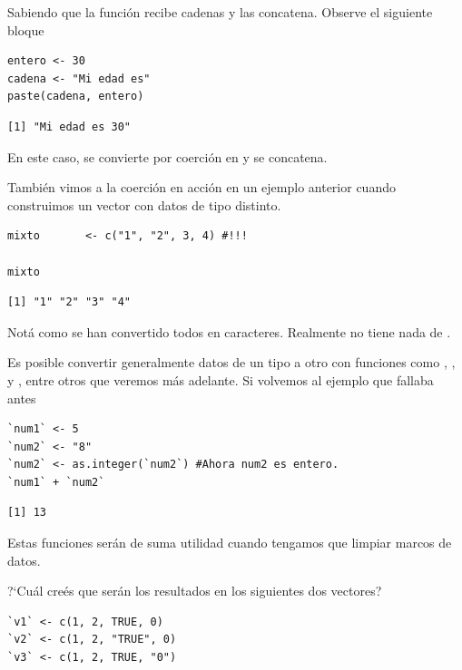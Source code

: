 \documentclass[8pt]{beamer}
\begin{document}
\begin{frame}[fragile]
	Sabiendo que la función  recibe cadenas y las concatena. Observe el siguiente bloque
\begin{lstlisting}[style=RScript]
entero <- 30
cadena <- "Mi edad es"
paste(cadena, entero)
\end{lstlisting}
\begin{lstlisting}[style=RConsole]
[1] "Mi edad es 30"
\end{lstlisting}

En este caso,  se convierte por coerción en  y se concatena.
\end{frame}








\begin{frame}[fragile]
	Tambi\'en vimos a la coerci\'on en acci\'on en un ejemplo anterior cuando construimos un vector con datos de tipo distinto.
\begin{lstlisting}[style=RScript]
mixto		<- c("1", "2", 3, 4) #!!!

mixto
\end{lstlisting}
\begin{lstlisting}[style=RConsole]
[1] "1" "2" "3" "4"
\end{lstlisting}

Not\'a como se han convertido todos en caracteres. Realmente no tiene nada de .
\end{frame}








\begin{frame}[fragile]
	Es posible convertir generalmente datos de un tipo a otro con funciones como , ,  y , entre otros que veremos más adelante. Si volvemos al ejemplo que fallaba antes
\begin{lstlisting}[style=RScript]
`num1` <- 5
`num2` <- "8"
`num2` <- as.integer(`num2`) #Ahora num2 es entero.
`num1` + `num2`
\end{lstlisting}
\begin{lstlisting}[style=RConsole]
[1] 13
\end{lstlisting}

Estas funciones serán de suma utilidad cuando tengamos que limpiar marcos de datos.

?`Cu\'al cre\'es que ser\'an los resultados en los siguientes dos vectores?

\begin{lstlisting}[style=RScript]
`v1` <- c(1, 2, TRUE, 0)
`v2` <- c(1, 2, "TRUE", 0)
`v3` <- c(1, 2, TRUE, "0")
\end{lstlisting}
\end{frame}
\end{document}
